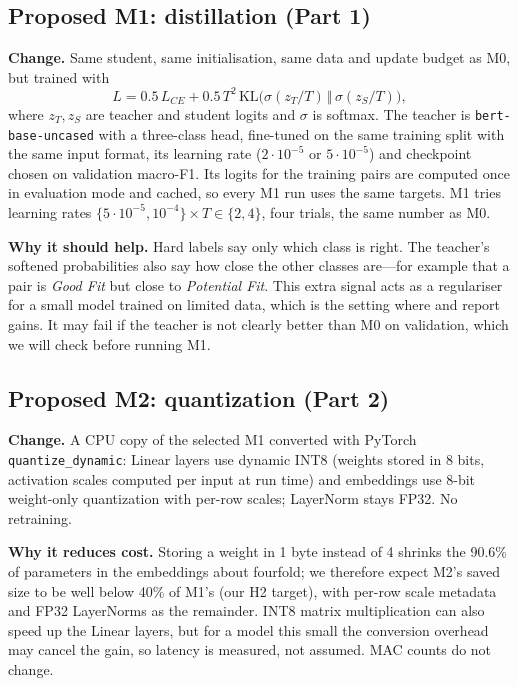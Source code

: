 \documentclass[11pt]{article}
\begin{document}
\subsection{Proposed M1: distillation (Part 1)}
\textbf{Change.} Same student, same initialisation, same data and update budget as M0, but trained with
\begin{equation}
L=0.5\,L_{CE}+0.5\,T^2\,\mathrm{KL}\big(\sigma(z_T/T)\,\Vert\,\sigma(z_S/T)\big),
\end{equation}
where $z_T, z_S$ are teacher and student logits and $\sigma$ is softmax. The teacher is \texttt{bert-base-uncased} with a three-class head, fine-tuned on the same training split with the same input format, its learning rate ($2\cdot10^{-5}$ or $5\cdot10^{-5}$) and checkpoint chosen on validation macro-F1. Its logits for the training pairs are computed once in evaluation mode and cached, so every M1 run uses the same targets. M1 tries learning rates $\{5\cdot10^{-5}, 10^{-4}\} \times T\in\{2,4\}$, four trials, the same number as M0.

\textbf{Why it should help.} Hard labels say only which class is right. The teacher's softened probabilities also say how close the other classes are---for example that a pair is \emph{Good Fit} but close to \emph{Potential Fit}. This extra signal acts as a regulariser for a small model trained on limited data, which is the setting where \citet{hinton} and \citet{turc} report gains. It may fail if the teacher is not clearly better than M0 on validation, which we will check before running M1.

\subsection{Proposed M2: quantization (Part 2)}
\textbf{Change.} A CPU copy of the selected M1 converted with PyTorch \texttt{quantize\_dynamic}: Linear layers use dynamic INT8 (weights stored in 8 bits, activation scales computed per input at run time) and embeddings use 8-bit weight-only quantization with per-row scales; LayerNorm stays FP32. No retraining.

\textbf{Why it reduces cost.} Storing a weight in 1 byte instead of 4 shrinks the 90.6\% of parameters in the embeddings about fourfold; we therefore expect M2's saved size to be well below 40\% of M1's (our H2 target), with per-row scale metadata and FP32 LayerNorms as the remainder. INT8 matrix multiplication can also speed up the Linear layers, but for a model this small the conversion overhead may cancel the gain, so latency is measured, not assumed. MAC counts do not change.
\end{document}
